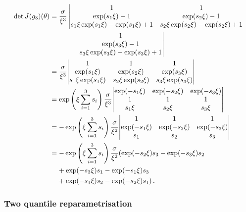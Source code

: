 \documentclass{article}
\DeclarePairedDelimiter\abs{\lvert}{\rvert}
\begin{document}
\begin{align*}
	\det J(g_3)(\theta)
		&= \frac{\sigma}{\xi ^ {3}} \left\vert
		\begin{matrix}
			1 &1\\
			\exp(s_1 \xi)-1 &\exp(s_2 \xi)-1\\
			s_1 \xi \exp(s_1 \xi) - \exp(s_1 \xi) + 1
				&s_2 \xi \exp(s_2 \xi) - \exp(s_2 \xi) + 1
		\end{matrix}
	\right.\\
	&\qquad \qquad \left.
		\begin{matrix}
			1\\
			\exp(s_3 \xi) - 1\\
			s_3 \xi \exp(s_3 \xi) -\exp(s_3 \xi) + 1
		\end{matrix}
	\right\vert\\
	&= \frac{\sigma}{\xi ^ {3}} \abs*{
		\begin{matrix}
			1 &1 &1\\
			\exp(s_1 \xi) &\exp(s_2 \xi) &\exp(s_3 \xi)\\
			s_1 \xi \exp(s_1 \xi)
				&s_2 \xi \exp(s_2 \xi)
				&s_3 \xi \exp(s_3 \xi)
		\end{matrix} }\\	
	&= \exp\left(\xi\sum_{i = 1}^3 s_i\right) \frac{\sigma}{\xi ^ {3}}
		\abs*{
			\begin{matrix}
				\exp(-s_1 \xi) &\exp(-s_2 \xi) &\exp(-s_3 \xi)\\
				1 &1 &1 \\
				s_1 \xi 
					&s_2 \xi
					&s_3 \xi
			\end{matrix} } \\
	&= -\exp\left(\xi\sum_{i = 1}^3 s_i\right) \frac{\sigma}{\xi ^ 2}
		\abs*{
			\begin{matrix}
				1 &1 &1 \\
				\exp(-s_1 \xi) &\exp(-s_2 \xi) &\exp(-s_3 \xi) \\
				s_1 &s_2 &s_3
			\end{matrix} } \\
	&= -\exp\left(\xi\sum_{i = 1}^3 s_i\right) \frac{\sigma}{\xi ^ 2}
		(\exp(-s_2 \xi) s_3 - \exp(-s_3 \xi) s_2 \\
	&\ \phantom{=}
		+ \exp(-s_3 \xi) s_1 - \exp(-s_1 \xi) s_3 \\
	&\ \phantom{=}
		+ \exp(-s_1 \xi) s_2 - \exp(-s_2 \xi) s_1) \,.
\end{align*}
%
\subsubsection*{Two quantile reparametrisation}
%
\end{document}
